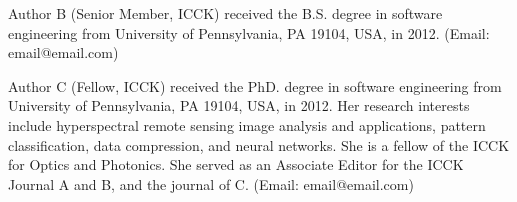 \documentclass[twocolumn]{ICCKjournal} %
\begin{document}
  \begin{biography}[author2]{Author B} (Senior Member, ICCK) received the B.S. degree in software engineering from University of Pennsylvania, PA 19104, USA, in 2012. (Email: email@email.com)
  \end{biography}

  \begin{biographynophoto}{Author C} (Fellow, ICCK) received the PhD. degree in software engineering from University of Pennsylvania, PA 19104, USA, in 2012. Her research interests include hyperspectral remote sensing image analysis and applications, pattern classification, data compression, and neural networks. She is a fellow of the ICCK for Optics and Photonics. She served as an Associate Editor for the ICCK Journal A and B, and the journal of C. (Email: email@email.com)
  \end{biographynophoto}

\else

\fi

\makeatother
\end{document}
